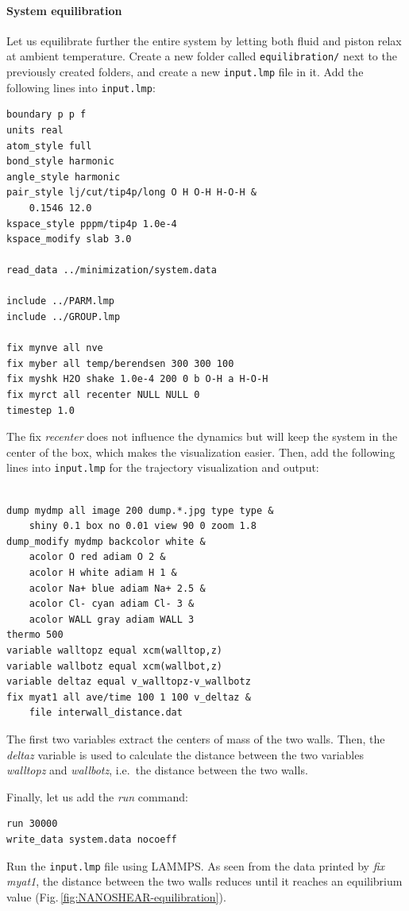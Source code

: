 \documentclass[9pt,tutorial]{livecoms}
\newcommand{\flrcmd}[1]{\textcolor{command}{\texttt{#1}}} %
\newcommand{\flecmd}[1]{\textcolor{command}{\texttt{#1}}} %
\begin{document}
\paragraph{System equilibration}
Let us equilibrate further the entire system by letting both fluid and piston
relax at ambient temperature. Create a new folder called \flrcmd{equilibration/}
next to the previously created folders, and create a new \flecmd{input.lmp}
file in it. Add the following lines into \flecmd{input.lmp}:
\begin{lstlisting}
boundary p p f
units real
atom_style full
bond_style harmonic
angle_style harmonic
pair_style lj/cut/tip4p/long O H O-H H-O-H &
    0.1546 12.0
kspace_style pppm/tip4p 1.0e-4
kspace_modify slab 3.0

read_data ../minimization/system.data

include ../PARM.lmp
include ../GROUP.lmp

fix mynve all nve
fix myber all temp/berendsen 300 300 100
fix myshk H2O shake 1.0e-4 200 0 b O-H a H-O-H
fix myrct all recenter NULL NULL 0
timestep 1.0
\end{lstlisting}
The fix \textit{recenter} does not influence the dynamics but will keep the
system in the center of the box, which makes the
visualization easier. Then, add the following lines into \flecmd{input.lmp}
for the trajectory visualization and output:
\begin{lstlisting}

dump mydmp all image 200 dump.*.jpg type type &
    shiny 0.1 box no 0.01 view 90 0 zoom 1.8
dump_modify mydmp backcolor white &
    acolor O red adiam O 2 &
    acolor H white adiam H 1 &
    acolor Na+ blue adiam Na+ 2.5 &
    acolor Cl- cyan adiam Cl- 3 &
    acolor WALL gray adiam WALL 3
thermo 500
variable walltopz equal xcm(walltop,z)
variable wallbotz equal xcm(wallbot,z)
variable deltaz equal v_walltopz-v_wallbotz
fix myat1 all ave/time 100 1 100 v_deltaz &
    file interwall_distance.dat
\end{lstlisting}
The first two variables extract the centers of mass of the two walls. Then,
the \textit{deltaz} variable is used to calculate the distance between the two
variables \textit{walltopz} and \textit{wallbotz}, i.e.~the distance between the two walls.

Finally, let us add the \textit{run} command:
\begin{lstlisting}
run 30000
write_data system.data nocoeff
\end{lstlisting}
Run the \flecmd{input.lmp} file using LAMMPS. As seen from the data printed by
\textit{fix myat1}, the distance between the two walls reduces until it reaches
an equilibrium value (Fig.\,\ref{fig:NANOSHEAR-equilibration}).
\end{document}
